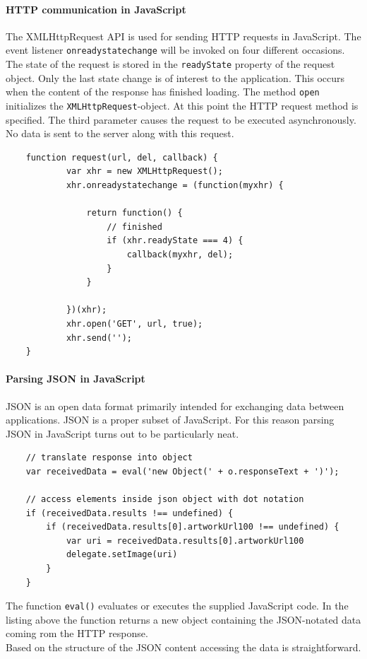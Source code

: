 \paragraph{HTTP communication in JavaScript}
The XMLHttpRequest API is used for sending HTTP requests in JavaScript.
The event listener {\tt onreadystatechange} will be invoked on four different occasions. The state of the request is stored in the {\tt readyState} property of the request object.
Only the last state change is of interest to the application. This occurs when the content of the response has finished loading. 
The method {\tt open} initializes the {\tt XMLHttpRequest}-object.
At this point the HTTP request method is specified. The third parameter causes the request to be executed asynchronously.
No data is sent to the server along with this request.
\begin{lstlisting}
    function request(url, del, callback) {
            var xhr = new XMLHttpRequest();
            xhr.onreadystatechange = (function(myxhr) {

                return function() {
                    // finished
                    if (xhr.readyState === 4) {
                        callback(myxhr, del);
                    }
                }

            })(xhr);
            xhr.open('GET', url, true);
            xhr.send('');
    }
\end{lstlisting}
\paragraph{Parsing JSON in JavaScript}
JSON is an open data format primarily intended for exchanging data between applications. JSON is a proper subset of JavaScript. For this reason parsing JSON in JavaScript turns out to be particularly neat.
\begin{lstlisting}
	// translate response into object
	var receivedData = eval('new Object(' + o.responseText + ')');
	
	// access elements inside json object with dot notation
	if (receivedData.results !== undefined) {
	    if (receivedData.results[0].artworkUrl100 !== undefined) {
	        var uri = receivedData.results[0].artworkUrl100
	        delegate.setImage(uri)
	    }
	}
\end{lstlisting}
The function {\tt eval()} evaluates or executes the supplied JavaScript code. In the listing above the function returns a new object containing the JSON-notated data coming rom the HTTP response. \\ Based on the structure of the JSON content accessing the data is straightforward.